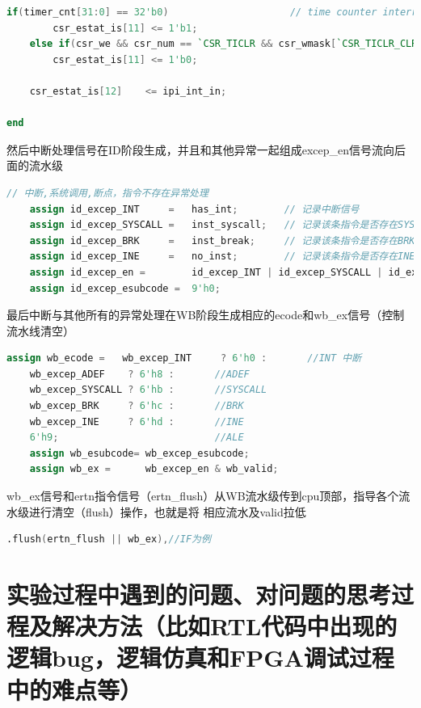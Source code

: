 \documentclass[11pt]{article}
\begin{document}
\begin{enumerate}
\begin{lstlisting}[language=verilog]
    if(timer_cnt[31:0] == 32'b0)                     // time counter interrupt
        csr_estat_is[11] <= 1'b1;
    else if(csr_we && csr_num == `CSR_TICLR && csr_wmask[`CSR_TICLR_CLR] && csr_wvalue[`CSR_TICLR_CLR])
        csr_estat_is[11] <= 1'b0;

    csr_estat_is[12]    <= ipi_int_in;   

end
\end{lstlisting}
然后中断处理信号在ID阶段生成，并且和其他异常一起组成excep_en信号流向后面的流水级
\begin{lstlisting}[language=verilog]
    // 中断,系统调用,断点，指令不存在异常处理
    assign id_excep_INT     =   has_int;        // 记录中断信号
    assign id_excep_SYSCALL =   inst_syscall;   // 记录该条指令是否存在SYSCALL异常
    assign id_excep_BRK     =   inst_break;     // 记录该条指令是否存在BRK异常
    assign id_excep_INE     =   no_inst;        // 记录该条指令是否存在INE异常
    assign id_excep_en =        id_excep_INT | id_excep_SYSCALL | id_excep_BRK | id_excep_INE | if_excep_en;         //只要有一个异常就置1
    assign id_excep_esubcode =  9'h0;
\end{lstlisting}
最后中断与其他所有的异常处理在WB阶段生成相应的ecode和wb_ex信号（控制流水线清空）
\begin{lstlisting}[language=verilog]
    assign wb_ecode =   wb_excep_INT     ? 6'h0 :       //INT 中断
    wb_excep_ADEF    ? 6'h8 :       //ADEF
    wb_excep_SYSCALL ? 6'hb :       //SYSCALL
    wb_excep_BRK     ? 6'hc :       //BRK
    wb_excep_INE     ? 6'hd :       //INE
    6'h9;                           //ALE                           
    assign wb_esubcode= wb_excep_esubcode;
    assign wb_ex =      wb_excep_en & wb_valid;

\end{lstlisting}
wb_ex信号和ertn指令信号（ertn_flush）从WB流水级传到cpu顶部，指导各个流水级进行清空（flush）操作，也就是将
相应流水及valid拉低
\begin{lstlisting}[language=verilog]
    .flush(ertn_flush || wb_ex),//IF为例
\end{lstlisting}


\end{enumerate}


\vspace{1ex}

\section{实验过程中遇到的问题、对问题的思考过程及解决方法（比如RTL代码中出现的逻辑bug，逻辑仿真和FPGA调试过程中的难点等）}
\end{document}
